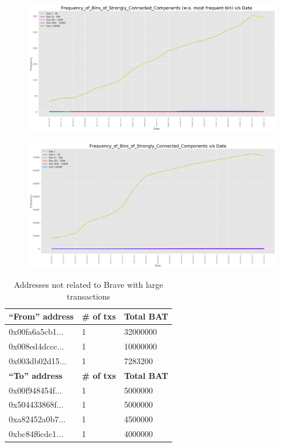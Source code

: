 \documentclass[sigconf]{acmart}
\begin{document}
\begin{figure}
\includegraphics[scale=0.38]{Frequency_of_Bins_of_Strongly_Connected_Components_without_most_frequent_bin_vs_Date.png}
\caption{ }
\label{fig:freq-of-bins-of-scc-wo-most-freq-vs-date}
\end{figure}

\begin{figure}
\includegraphics[scale=0.38]{Frequency_of_Bins_of_Strongly_Connected_Components_vs_Date.png}
\caption{ }
\label{fig:freq-of-bins-of-scc-vs-date}
\end{figure}

\begin{table}[]
\begin{tabular}{|lll|}%
\hline
\bfseries ``From'' address &\bfseries \# of txs&\bfseries Total BAT \\
\hline
0x00fa6a5cb1...&1&32000000\\
0x008ed4dccc...&1&10000000\\
0x003db02d15...&1&7283200\\
\hline
\bfseries ``To'' address &\bfseries \# of txs&\bfseries Total BAT\\
\hline
0x00f948454f...&1&5000000\\
0x504433868f...&1&5000000\\
0xa82452a0b7...&1&4500000\\
0xbc84f6cdc1...&1&4000000\\
\hline
\end{tabular}
\caption{Addresses not related to Brave with large transactions}
\label{tab:non-brave-large-tx}
\end{table}
\end{document}

